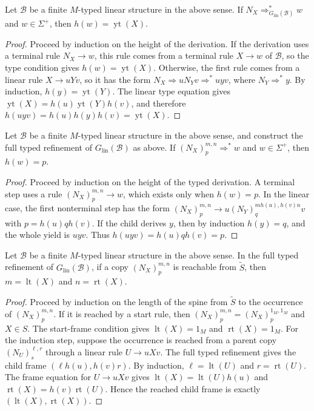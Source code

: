 \documentclass[sub]{jalc}
\newcommand{\yt}{\operatorname{yt}}
\newcommand{\lt}{\operatorname{lt}}
\newcommand{\rt}{\operatorname{rt}}
\newcommand{\eM}{1_M}
\begin{document}
\begin{lemma}
\label{lem:linear-untyped-yield-invariant}
Let \(\mathcal B\) be a finite \(M\)-typed linear structure in the above sense. If \(N_X\Rightarrow_{G_{\mathrm{lin}}(\mathcal B)}^*w\) and \(w\in\Sigma^+\), then \(h(w)=\yt(X)\).
\end{lemma}

\begin{proof}
Proceed by induction on the height of the derivation. If the derivation uses a terminal rule \(N_X\to w\), this rule comes from a terminal rule \(X\to w\) of \(\mathcal B\), so the type condition gives \(h(w)=\yt(X)\). Otherwise, the first rule comes from a linear rule \(X\to uYv\), so it has the form \(N_X\Rightarrow uN_Yv\Rightarrow^*uyv\), where \(N_Y\Rightarrow^*y\). By induction, \(h(y)=\yt(Y)\). The linear type equation gives \(\yt(X)=h(u)\yt(Y)h(v)\), and therefore \(h(uyv)=h(u)h(y)h(v)=\yt(X)\).
\end{proof}

\begin{lemma}
\label{lem:linear-typed-yield-invariant}
Let \(\mathcal B\) be a finite \(M\)-typed linear structure in the above sense, and construct the full typed refinement of \(G_{\mathrm{lin}}(\mathcal B)\) as above. If \((N_X)_p^{m,n}\Rightarrow^*w\) and \(w\in\Sigma^+\), then \(h(w)=p\).
\end{lemma}

\begin{proof}
Proceed by induction on the height of the typed derivation. A terminal step uses a rule \((N_X)_p^{m,n}\to w\), which exists only when \(h(w)=p\). In the linear case, the first nonterminal step has the form \((N_X)_p^{m,n}\to u(N_Y)_q^{m h(u),h(v)n}v\) with \(p=h(u)qh(v)\). If the child derives \(y\), then by induction \(h(y)=q\), and the whole yield is \(uyv\). Thus \(h(uyv)=h(u)qh(v)=p\).
\end{proof}

\begin{lemma}
\label{lem:linear-frame-invariant}
Let \(\mathcal B\) be a finite \(M\)-typed linear structure in the above sense. In the full typed refinement of \(G_{\mathrm{lin}}(\mathcal B)\), if a copy \((N_X)_p^{m,n}\) is reachable from \(\widetilde S\), then \(m=\lt(X)\) and \(n=\rt(X)\).
\end{lemma}

\begin{proof}
Proceed by induction on the length of the spine from \(\widetilde S\) to the occurrence of \((N_X)_p^{m,n}\). If it is reached by a start rule, then \((N_X)_p^{m,n}=(N_X)_p^{\eM,\eM}\) and \(X\in S\). The start-frame condition gives \(\lt(X)=\eM\) and \(\rt(X)=\eM\). For the induction step, suppose the occurrence is reached from a parent copy \((N_U)_s^{\ell,r}\) through a linear rule \(U\to uXv\). The full typed refinement gives the child frame \((\ell h(u),h(v)r)\). By induction, \(\ell=\lt(U)\) and \(r=\rt(U)\). The frame equation for \(U\to uXv\) gives \(\lt(X)=\lt(U)h(u)\) and \(\rt(X)=h(v)\rt(U)\). Hence the reached child frame is exactly \((\lt(X),\rt(X))\).
\end{proof}
\end{document}
